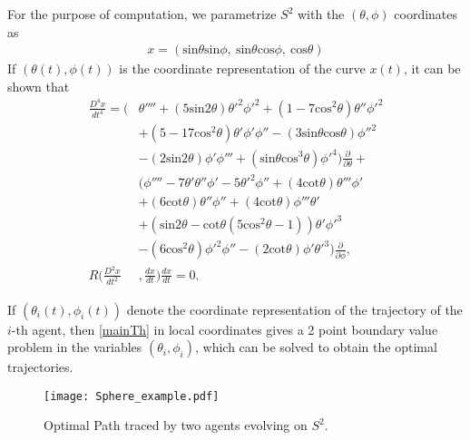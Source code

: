 \documentclass[letterpaper, 10 pt, conference]{ieeeconf}  %
\begin{document}
For the purpose of computation, we parametrize $S^2$ with the $(\theta, \phi)$ coordinates as
\begin{align*}
x = (\text{sin}\theta \text{sin}\phi, \ \text{sin}\theta \text{cos}\phi, \ \text{cos}\theta)
\end{align*}
If $(\theta(t), \phi(t))$ is the coordinate representation of the curve $x(t)$, it can be shown that
\begin{align*}
\frac{D^4x}{dt^4} = \Big(&\theta'''' + (5\text{sin}2\theta) \theta'^2\phi'^2 +(1-7\text{cos}^2\theta)\theta''\phi'^2 \\& +(5-17\text{cos}^2\theta)\theta'\phi'\phi'' - (3\text{sin}\theta\text{cos}\theta)\phi''^2 \\& - (2\text{sin}2\theta)\phi'\phi''' + (\text{sin}\theta\text{cos}^3\theta)\phi'^4 \Big)\frac{\partial}{\partial \theta} + \\ & \Big(\phi'''' - 7\theta'\theta''\phi' -5\theta'^2\phi'' + (4\text{cot}\theta)\theta'''\phi' \\& + (6\text{cot}\theta)\theta''\phi'' + (4\text{cot}\theta)\phi'''\theta' \\& + (\text{sin}2\theta-\text{cot}\theta(5\text{cos}^2\theta-1))\theta'\phi'^3 \\ &- (6\text{cos}^2\theta)\phi'^2\phi'' - (2\text{cot}\theta)\phi'\theta'^3 \Big)\frac{\partial}{\partial \phi}, \\
 R \Big(\frac{D^2 x}{dt^2}&, \frac{dx}{dt} \Big)\frac{dx}{dt} = 0. 
\end{align*}

If $(\theta_i(t), \phi_i(t))$ denote the coordinate representation of the trajectory of the $i$-th agent, then \ref{mainTh} in local coordinates gives a 2 point boundary value problem in the variables $(\theta_i,\phi_i)$, which can be solved to obtain the optimal trajectories.
\iffalse
\begin{center}
\begin{figure}
\texttt{[image: sphere.eps]}
\caption{Optimal Path traced by two agents evolving on $S^2$.} \label{fig:M2}
\end{figure}
\end{center}
\fi

\begin{figure}
\centering
\texttt{[image: Sphere\_example.pdf]}
\caption{Optimal Path traced by two agents evolving on $S^2$.} \label{fig:M2}
\end{figure}


\end{document}
